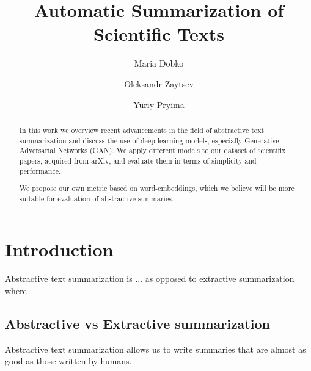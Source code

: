 \documentclass[sigplan]{acmart}
\begin{document}
\title{Automatic Summarization of Scientific Texts}

\author{Maria Dobko}

\author{Oleksandr Zaytsev}

\author{Yuriy Pryima}

\begin{abstract}

In this work we overview recent advancements in the field of abstractive text summarization and discuss the use of deep learning models, especially Generative Adversarial Networks (GAN). We apply different models to our dataset of scientifix papers, acquired from arXiv, and evaluate them in terms of simplicity and performance.

We propose our own metric based on word-embeddings, which we believe will be more suitable for evaluation of abstractive summaries.

\end{abstract}


\maketitle

\section{Introduction}
Abstractive text summarization is ...
as opposed to extractive summarization where

\subsection{Abstractive vs Extractive summarization}

Abstractive text summarization allows us to write summaries that are almost as good as those written by humans.
\end{document}
